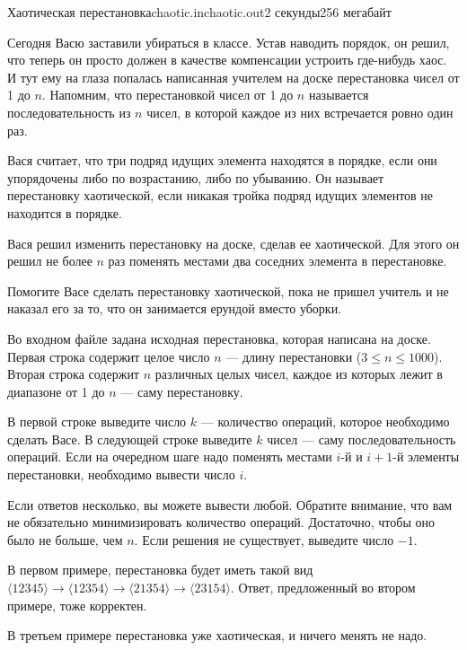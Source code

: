 \begin{problem}{Хаотическая перестановка}{chaotic.in}{chaotic.out}{2 секунды}{256 мегабайт}


Сегодня Васю заставили убираться в классе. Устав наводить порядок, он решил,
что теперь он просто должен в качестве компенсации устроить где-нибудь хаос. 
И тут ему на глаза попалась 
написанная учителем на доске перестановка чисел от 1 до $n$.
Напомним, что перестановкой чисел от 1 до $n$ называется последовательность из $n$ 
чисел, в которой каждое из них встречается ровно один раз.

Вася считает, что три подряд идущих элемента находятся в порядке, если они
упорядочены либо по возрастанию, либо по убыванию. Он называет перестановку
хаотической, если никакая тройка подряд идущих элементов не находится в порядке.

Вася решил изменить перестановку на доске, сделав ее хаотической.
Для этого он решил не более $n$ раз поменять местами два соседних элемента
в перестановке.

Помогите Васе сделать перестановку хаотической, пока не пришел учитель и не наказал его
за то, что он занимается ерундой вместо уборки.

\InputFile

Во входном файле задана исходная перестановка, которая написана на доске.
Первая строка содержит целое число $n$ --- длину перестановки ($3 \le n \le 1000$).
Вторая строка содержит $n$ различных целых чисел, каждое из которых лежит
в диапазоне от 1 до $n$ --- саму перестановку. 

\OutputFile

В первой строке выведите число $k$ --- количество операций, которое необходимо сделать Васе.
В следующей строке выведите $k$ чисел --- саму последовательность операций. Если на очередном
шаге надо поменять местами $i$-й и $i+1$-й элементы перестановки, необходимо вывести число $i$.

Если ответов несколько, вы можете вывести любой. Обратите внимание, что вам не обязательно
минимизировать количество операций. Достаточно, чтобы оно было не больше, чем $n$.
Если решения не существует, выведите число $-1$. 

\Examples

\begin{example}%
%
%
%
\end{example}

\Note

В первом примере, перестановка будет иметь такой вид
$\langle 1 2 3 4 5\rangle \rightarrow \langle 1 2 3 5 4\rangle \rightarrow \langle 2 1 3 5 4\rangle \rightarrow \langle 2 3 1 5 4\rangle$.
Ответ, предложенный во втором примере, тоже корректен.

В третьем примере перестановка уже хаотическая, и ничего менять не надо.

\end{problem}
